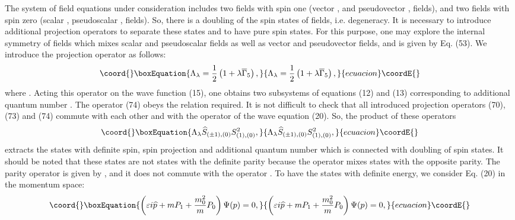 \documentclass[a4paper,12pt]{article}
\begin{document}
The system of field equations under consideration includes two
fields with spin one (vector \myHighlight{$\psi _\mu $}\coordHE{}, and pseudovector
\myHighlight{$\widetilde{\psi }_\mu $}\coordHE{}, fields), and two fields with spin zero
(scalar \coordHE{}, pseudoscalar \coordHE{}, fields).
So, there is a doubling of the spin states of fields, i.e.
degeneracy. It is necessary to introduce additional projection
operators to separate these states and to have pure spin states.
For this purpose, one may explore the internal symmetry of fields
which mixes scalar and pseudoscalar fields as well as vector and
pseudovector fields, and is given by Eq. (53). We introduce the
projection operator as follows:
\begin{equation}\coord{}\boxEquation{
\Lambda _\lambda =\frac 12\left( 1+\lambda \overline{\Gamma
}_5\right) , \label{74}
}{
\Lambda _\lambda =\frac 12\left( 1+\lambda \overline{\Gamma
}_5\right) , }{ecuacion}\coordE{}\end{equation}
where \coordHE{}. Acting this operator on the wave function
(15), one obtains two subsystems of equations (12) and (13)
corresponding to additional quantum number \coordHE{}. The
operator (74) obeys the relation \coordHE{} required. It is not difficult to check that all
introduced projection operators (70), (73) and (74) commute with
each other and with the operator of the wave equation (20). So,
the product of these operators
\begin{equation}\coord{}\boxEquation{
\Lambda _\lambda\widehat{S}_{(\pm 1), (0)}S_{(1), (0)}^2 ,
\label{75}
}{
\Lambda _\lambda\widehat{S}_{(\pm 1), (0)}S_{(1), (0)}^2 ,
}{ecuacion}\coordE{}\end{equation}
extracts the states with definite spin, spin projection and
additional quantum number \coordHE{} which is connected with
doubling of spin states. It should be noted that these states are
not states with the definite parity because the operator \myHighlight{$\Lambda
_\lambda$}\coordHE{} mixes states with the opposite parity. The parity
operator is given by \coordHE{}, and
it does not commute with the operator \myHighlight{$\Lambda _\lambda$}\coordHE{}. To have
the states with definite energy, we consider Eq. (20) in the
momentum space:
\begin{equation}\coord{}\boxEquation{
\left( \varepsilon i\widehat{p} + m P_1+\frac{m_0^2}{m}P_0\right)
\Psi (p)=0 ,\label{76}
}{
\left( \varepsilon i\widehat{p} + m P_1+\frac{m_0^2}{m}P_0\right)
\Psi (p)=0 ,}{ecuacion}\coordE{}\end{equation}
\end{document}
